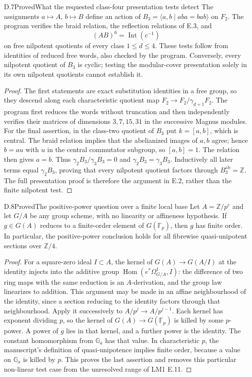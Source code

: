 \begin{statement}{D.7}{Proved}{What the requested class-four presentation tests detect}
The assignments $a\mapsto A$, $b\mapsto B$ define an action of
$B_3=\langle a,b\mid aba=bab\rangle$ on $F_2$.  The program verifies
the braid relation, the reflection relations of E.3, and
\[
 (AB)^6=\operatorname{Int}(c^{-1})
\]
on free nilpotent quotients of every class $1\leq d\leq4$.
These tests follow from identities of reduced free words, also
checked by the program.  Conversely, every nilpotent quotient of
$B_3$ is cyclic; testing the modular-cover presentation solely
in its own nilpotent quotients cannot establish it.
\end{statement}
\begin{proof}
The first statements are exact substitution identities in a free
group, so they descend along each characteristic quotient map
$F_2\to F_2/\gamma_{d+1}F_2$.  The program first reduces the words
without truncation and then independently verifies their matrices
of dimensions $3,7,15,31$ in the successive Magnus modules.
For the final assertion, in the class-two quotient of $B_3$ put
$k=[a,b]$, which is central.  The braid relation implies that the
abelianized images of $a,b$ agree; hence $b=a u$ with $u$ in the
central commutator subgroup, so $[a,b]=1$.  The relation then gives
$a=b$.  Thus $\gamma_2B_3/\gamma_3B_3=0$ and
$\gamma_2B_3=\gamma_3B_3$.  Inductively all later terms equal
$\gamma_2B_3$, proving that every nilpotent quotient factors through
$B_3^{\mathrm{ab}}=\mathbb Z$.  The full presentation proof is
therefore the argument in E.2, rather than the finite nilpotent test.
\end{proof}

\begin{statement}{D.8}{Proved}{The positive-power question over a finite local base}
Let $A=\mathbb Z/p^e$ and let $G/A$ be any group scheme, with no
linearity or affineness hypothesis.  If $g\in G(A)$ reduces to a
finite-order element of $G(\mathbb F_p)$, then $g$ has finite
order.  In particular, the positive-power conclusion holds for
all fibrewise quasi-unipotent sections over $\mathbb Z/4$.
\end{statement}
\begin{proof}
For a square-zero ideal $I\subset A$, the kernel of
$G(A)\to G(A/I)$ at the identity injects into the additive group
$\operatorname{Hom}(e^*\Omega^1_{G/A},I)$: the difference of two
ring maps with the same reduction is an $A$-derivation, and the
group law linearizes to addition.  This argument may be made in
an affine neighbourhood of the identity, since a section reducing
to the identity factors through that neighbourhood.  Apply it
successively to $A/p^j\to A/p^{j-1}$.  Each kernel has exponent
dividing $p$, so the kernel of $G(A)\to G(\mathbb F_p)$ is killed
by some $p$-power.  A power of $g$ lies in that kernel, and a
further power is the identity.  The constant homomorphism from
$\mathbb G_a$ has that value.  In characteristic $p$, the
manuscript's definition of quasi-unipotence implies finite order,
because a value on $\mathbb G_a$ is killed by $p$.  This proves
the last assertion and removes this particular non-linear
test case from the unresolved range of LM1 E.11.
\end{proof}

